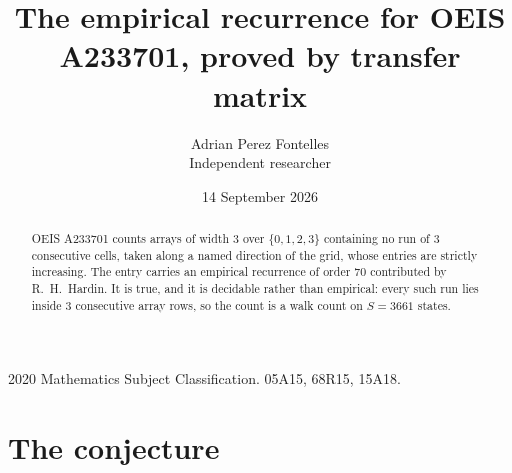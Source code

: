 \documentclass[11pt,a4paper]{article}
\title{The empirical recurrence for OEIS A233701, proved by transfer matrix}
\author{Adrian Perez Fontelles\\ \small Independent researcher}
\date{14 September 2026}
\theoremstyle{plain}
\theoremstyle{definition}
\begin{document}
\maketitle

\begin{abstract}
OEIS A233701 counts arrays of width $3$ over $\{0,1,2,3\}$ containing no run of $3$ consecutive
cells, taken along a named direction of the grid, whose entries are strictly increasing. The entry carries
an empirical recurrence of order $70$ contributed by R.~H.~Hardin. It is true, and it is
decidable rather than empirical: every such run lies inside $3$ consecutive array rows, so
the count is a walk count on $S=3661$ states.
\end{abstract}

\noindent\small 2020 Mathematics Subject Classification. 05A15, 68R15, 15A18.\normalsize

\section{The conjecture}
\end{document}
